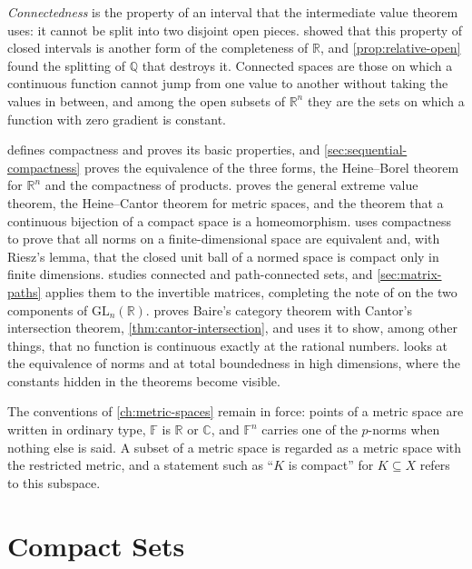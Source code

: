 \emph{Connectedness} is the property of an interval that the intermediate value theorem uses: it cannot be split into two disjoint open pieces.  showed that this property of closed intervals is another form of the completeness of $\mathbb R$, and \cref{prop:relative-open} found the splitting of $\mathbb Q$ that destroys it. Connected spaces are those on which a continuous function cannot jump from one value to another without taking the values in between, and among the open subsets of $\mathbb R^n$ they are the sets on which a function with zero gradient is constant.

 defines compactness and proves its basic properties, and \cref{sec:sequential-compactness} proves the equivalence of the three forms, the Heine--Borel theorem for $\mathbb R^n$ and the compactness of products.  proves the general extreme value theorem, the Heine--Cantor theorem for metric spaces, and the theorem that a continuous bijection of a compact space is a homeomorphism.  uses compactness to prove that all norms on a finite-dimensional space are equivalent and, with Riesz's lemma, that the closed unit ball of a normed space is compact only in finite dimensions.  studies connected and path-connected sets, and \cref{sec:matrix-paths} applies them to the invertible matrices, completing the note of  on the two components of $\mathrm{GL}_n(\mathbb R)$.  proves Baire's category theorem with Cantor's intersection theorem, \cref{thm:cantor-intersection}, and uses it to show, among other things, that no function is continuous exactly at the rational numbers.  looks at the equivalence of norms and at total boundedness in high dimensions, where the constants hidden in the theorems become visible.

The conventions of \cref{ch:metric-spaces} remain in force: points of a metric space are written in ordinary type, $\mathbb F$ is $\mathbb R$ or $\mathbb C$, and $\mathbb F^n$ carries one of the $p$-norms when nothing else is said. A subset of a metric space is regarded as a metric space with the restricted metric, and a statement such as ``$K$ is compact'' for $K\subseteq X$ refers to this subspace.

\section{Compact Sets}
\label{sec:compact-sets}

